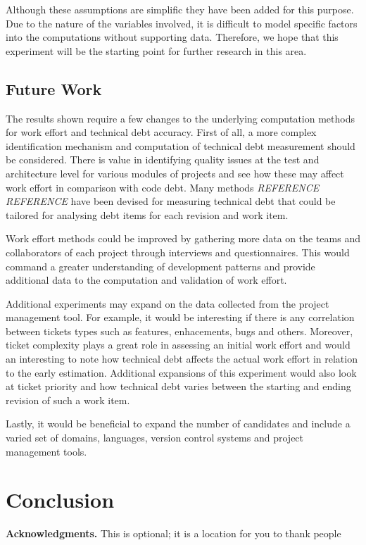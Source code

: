 \documentclass{mpaper}
\begin{document}
Although these assumptions are simplific they have been added for this purpose.
Due to the nature of the variables involved, it is difficult to model specific
factors into the computations without supporting data. Therefore, we hope that
this experiment will be the starting point for further research in this area. 

\subsection{Future Work}
\label{future-work}

The results shown require a few changes to the underlying computation methods
for work effort and technical debt accuracy. First of all, a more complex
identification mechanism and computation of technical debt measurement should be
considered. There is value in identifying quality issues at the test and
architecture level for various modules of projects and see how these may affect
work effort in comparison with code debt. Many methods \emph{REFERENCE}
\emph{REFERENCE} have been devised for measuring technical debt that could be
tailored for analysing debt items for each revision and work item.

Work effort methods could be improved by gathering more data on the teams and
collaborators of each project through interviews and questionnaires. This would
command a greater understanding of development patterns and provide additional
data to the computation and validation of work effort.

Additional experiments may expand on the data collected from the project
management tool. For example, it would be interesting if there is any
correlation between tickets types such as features, enhacements, bugs and
others. Moreover, ticket complexity plays a great role in assessing an initial
work effort and would an interesting to note how technical debt affects the
actual work effort in relation to the early estimation. Additional expansions of
this experiment would also look at ticket priority and how technical debt varies
between the starting and ending revision of such a work item. 

Lastly, it would be beneficial to expand the number of candidates and include a
varied set of domains, languages, version control systems and project management
tools.

\section{Conclusion}
\label{conclusion}

{\bf Acknowledgments.} This is optional; it is a location for you to thank
people



\end{document}
